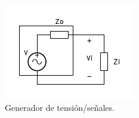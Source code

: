 \begin{figure}[H]
    \centering
    \includegraphics[width=\columnwidth]{img/circ/vsource.pdf}
    \caption{Generador de tensión/señales.}
    \label{fig:vsource}
\end{figure}